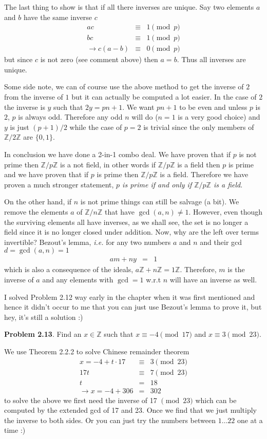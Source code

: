 \documentclass[aps,preprint,preprintnumbers,nofootinbib,showpacs,prd]{revtex4-1}
\newcommand{\ie}{{\it i.e.} }
\newcommand{\nbea}{\begin{eqnarray*}}
\newcommand{\neea}{\end{eqnarray*}}
\begin{document}
The last thing to show is that if all there inverses are unique. Say two elements $a$ and $b$ have the same inverse $c$
%
\nbea
ac & \equiv & 1 \pmod{p} \\
bc & \equiv & 1 \pmod{p} \\
\to c(a-b) & \equiv & 0 \pmod{p}
\neea
%
but since $c$ is not zero (see comment above) then $a=b$. Thus all inverses are unique.

Some side note, we can of course use the above method to get the inverse of $2$ from the inverse of $1$ but it can actually be computed a lot easier. In the case of $2$ the inverse is $y$ such that $2y = pn +  1$. We want $pn + 1$ to be even and unless $p$ is $2$, $p$ is always odd. Therefore any odd $n$ will do ($n=1$ is a very good choice) and $y$ is just $(p+1)/2$ while the case of $p=2$ is trivial since the only members of $\mathbb{Z}/2\mathbb{Z}$ are $\{0,1\}$.

In conclusion we have done a 2-in-1 combo deal. We have proven that if $p$ is not prime then $\mathbb{Z}/p\mathbb{Z}$ is a not field, in other words if $\mathbb{Z}/p\mathbb{Z}$ is a field then $p$ is prime and we have proven that if $p$ is prime then $\mathbb{Z}/p\mathbb{Z}$ is a field. Therefore we have proven a much stronger statement, {\it $p$ is prime if and only if $\mathbb{Z}/p\mathbb{Z}$ is a field}.

On the other hand, if $n$ is not prime things can still be salvage (a bit). We remove the elements $a$ of $\mathbb{Z}/n\mathbb{Z}$ that have $\gcd(a,n) \neq 1$. However, even though the surviving elements all have inverses, as we shall see, the set is no longer a field since it is no longer closed under addition. Now, why are the left over terms invertible? Bezout's lemma, \ie for any two numbers $a$ and $n$ and their gcd $d = \gcd(a,n) = 1$
%
\nbea
am + ny & = & 1
\neea
%
which is also a consequence of the ideals, $a\mathbb{Z} + n\mathbb{Z} = 1\mathbb{Z}$. Therefore, $m$ is the inverse of $a$ and any elements with $\gcd=1$ w.r.t $n$ will have an inverse as well.

I solved Problem 2.12 way early in the chapter when it was first mentioned and hence it didn't occur to me that you can just use Bezout's lemma to prove it, but hey, it's still a solution :)

{\bf Problem 2.13}. Find an $x \in \mathbb{Z}$ such that $x \equiv −4 \pmod{17}$ and $x \equiv 3 \pmod{23}$.

We use Theorem 2.2.2 to solve Chinese remainder theorem
%
\nbea
x = -4 + t\cdot 17 & \equiv & 3 \pmod{23} \\
17 t & \equiv & 7 \pmod{23} \\
t & = & 18 \\
\to x = -4 + 306 & = & 302
\neea
%
to solve the above we first need the inverse of 17 $\pmod{23}$ which can be computed by the extended gcd of 17 and 23. Once we find that we just multiply the inverse to both sides. Or you can just try the numbers between $1 \dots 22$ one at a time :)
\end{document}

